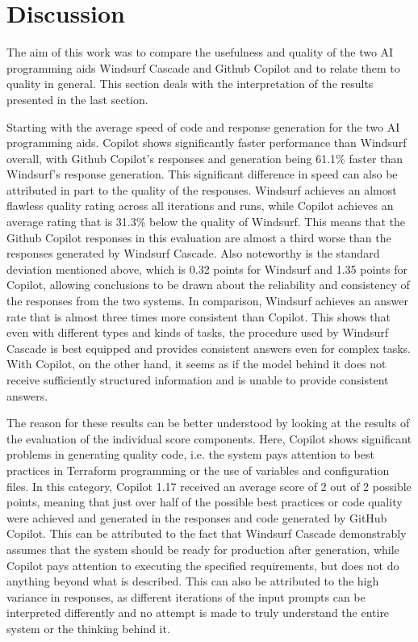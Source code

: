 \section{Discussion}
\label{sec:discussion}

The aim of this work was to compare the usefulness and quality of the two AI programming aids Windsurf Cascade and Github Copilot and to relate them to quality in general. This section deals with the interpretation of the results presented in the last section.

Starting with the average speed of code and response generation for the two AI programming aids. Copilot shows significantly faster performance than Windsurf overall, with Github Copilot's responses and generation being 61.1\% faster than Windsurf's response generation. This significant difference in speed can also be attributed in part to the quality of the responses. Windsurf achieves an almost flawless quality rating across all iterations and runs, while Copilot achieves an average rating that is 31.3\% below the quality of Windsurf. This means that the Github Copilot responses in this evaluation are almost a third worse than the responses generated by Windsurf Cascade. Also noteworthy is the standard deviation mentioned above, which is 0.32 points for Windsurf and 1.35 points for Copilot, allowing conclusions to be drawn about the reliability and consistency of the responses from the two systems. In comparison, Windsurf achieves an answer rate that is almost three times more consistent than Copilot. This shows that even with different types and kinds of tasks, the procedure used by Windsurf Cascade is best equipped and provides consistent answers even for complex tasks. With Copilot, on the other hand, it seems as if the model behind it does not receive sufficiently structured information and is unable to provide consistent answers.


The reason for these results can be better understood by looking at the results of the evaluation of the individual score components. Here, Copilot shows significant problems in generating quality code, i.e. the system pays attention to best practices in Terraform programming or the use of variables and configuration files. In this category, Copilot 1.17 received an average score of 2 out of 2 possible points, meaning that just over half of the possible best practices or code quality were achieved and generated in the responses and code generated by GitHub Copilot. This can be attributed to the fact that Windsurf Cascade demonstrably assumes that the system should be ready for production after generation, while Copilot pays attention to executing the specified requirements, but does not do anything beyond what is described. This can also be attributed to the high variance in responses, as different iterations of the input prompts can be interpreted differently and no attempt is made to truly understand the entire system or the thinking behind it.

